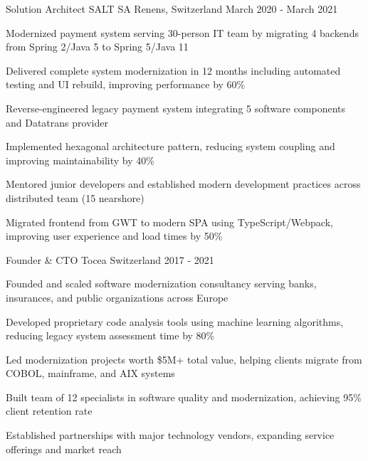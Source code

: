 \begin{cventries}
{\begin{cvitems}
        \end{cvitems}
    }
    \cventry
    {Solution Architect} %
    {SALT SA} %
    {Renens, Switzerland} %
    {March 2020 - March 2021} %
    {
        \begin{cvitems} %
            \item{Modernized payment system serving 30-person IT team by migrating 4 backends from Spring 2/Java 5 to Spring 5/Java 11}
            \item{Delivered complete system modernization in 12 months including automated testing and UI rebuild, improving performance by 60\%}
            \item{Reverse-engineered legacy payment system integrating 5 software components and Datatrans provider}
            \item{Implemented hexagonal architecture pattern, reducing system coupling and improving maintainability by 40\%}
            \item{Mentored junior developers and established modern development practices across distributed team (15 nearshore)}
            \item{Migrated frontend from GWT to modern SPA using TypeScript/Webpack, improving user experience and load times by 50\%}
        \end{cvitems}
    }
    \cventry
    {Founder \& CTO} %
    {Tocea} %
    {Switzerland} %
    {2017 - 2021} %
    {
        \begin{cvitems} %
            \item{Founded and scaled software modernization consultancy serving banks, insurances, and public organizations across Europe}
            \item{Developed proprietary code analysis tools using machine learning algorithms, reducing legacy system assessment time by 80\%}
            \item{Led modernization projects worth \$5M+ total value, helping clients migrate from COBOL, mainframe, and AIX systems}
            \item{Built team of 12 specialists in software quality and modernization, achieving 95\% client retention rate}
            \item{Established partnerships with major technology vendors, expanding service offerings and market reach}

\end{cvitems}}
\end{cventries}
